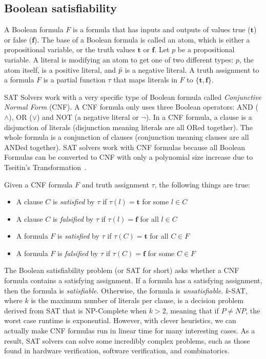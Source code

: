 \documentclass[12pt]{article}
\theoremstyle{definition}
\begin{document}
\subsection{Boolean satisfiability} \label{subsec:boolSAT}
A Boolean formula $F$ is a formula that has inputs and outputs of values true ($\boldsymbol{t}$) or false ($\boldsymbol{f}$). The base of a Boolean formula is called an atom, which is either a propositional variable, or the truth values $\boldsymbol{t}$ or $\boldsymbol{f}$. Let $p$ be a propositional variable. A literal is modifying an atom to get one of two different types: $p$, the atom itself, is a positive literal, and $\Bar{p}$  is a negative literal. A truth assignment to a formula $F$ is a partial function $\tau$ that maps literals in $F$ to $\{\boldsymbol{t}, \boldsymbol{f}\}$. \par
SAT Solvers work with a very specific type of Boolean formula called \textit{Conjunctive Normal Form} (CNF). A CNF formula only uses three Boolean operators: AND ($\wedge$), OR ($\vee$) and NOT (a negative literal or $\neg$). In a CNF formula, a clause is a disjunction of literals (disjunction meaning literals are all ORed together). The whole formula is a conjunction of clauses (conjunction meaning clauses are all ANDed together). SAT solvers work with CNF formulas because all Boolean Formulas can be converted to CNF with only a polynomial size increase due to Tseitin's Transformation~\cite{Tseitin70}. \par
Given a CNF formula $F$ and truth assignment $\tau$, the following things are true:
\begin{itemize}
    \item A clause $C$ is \textit{satisfied} by $\tau$ if $\tau(l) = \boldsymbol{t}$ for some $l \in C$
    \item A clause $C$ is \textit{falsified} by $\tau$ if $\tau(l) = \boldsymbol{f}$ for all $l \in C$
    \item A formula $F$ is \textit{satisfied} by $\tau$ if $\tau(C) = \boldsymbol{t}$ for all $C \in F$
    \item A formula $F$ is \textit{falsified} by $\tau$ if $\tau(C) = \boldsymbol{f}$ for some $C \in F$
\end{itemize}
The Boolean satisfiability problem (or SAT for short) asks whether a CNF formula contains a satisfying assignment. If a formula has a satisfying assignment, then the formula is \textit{satisfiable}. Otherwise, the formula is \textit{unsatisfiable}. $k$-SAT, where $k$ is the maximum number of literals per clause, is a decision problem derived from SAT that is NP-Complete when $k > 2$, meaning that if $P \ne NP$, the worst case runtime is exponential. However, with clever heuristics, we can actually make CNF formulas run in linear time for many interesting cases. As a result, SAT solvers can solve some incredibly complex problems, such as those found in hardware verification, software verification, and combinatorics.
\end{document}
